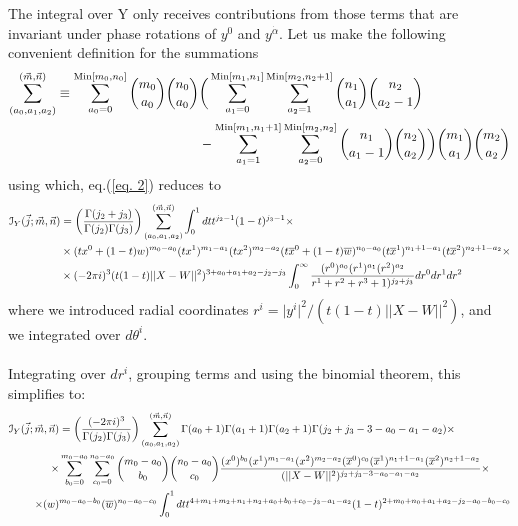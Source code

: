 \documentclass[../main.tex]{subfiles}
\begin{document}
The integral over Y only receives contributions from those terms that are invariant under phase rotations of $y^0$ and $y^{\dot{\alpha}}$. Let us make the following convenient definition for the summations
\begingroup \allowdisplaybreaks \begin{align}
    \sum_{(a_0,a_1,a_2)}^{(\vec{m},\vec{n})} \equiv \sum_{a_0=0}^{\text{Min}[m_0,n_0]} {m_0 \choose a_0}{n_0 \choose a_0} &\bigg( \sum_{a_1=0}^{\text{Min}[m_1,n_1]} \sum_{a_2=1}^{\text{Min}[m_2,n_2+1]} {n_1 \choose a_1}  {n_2 \choose a_2-1}  \\ &- \sum_{a_1=1}^{\text{Min}[m_1,n_1+1]} \sum_{a_2=0}^{\text{Min}[m_2,n_2]} {n_1 \choose a_1-1}  {n_2 \choose a_2}\bigg) {m_1 \choose a_1} {m_2 \choose a_2} \notag
\end{align} \endgroup
using which, eq.(\ref{eq. 2}) reduces to
\begingroup \allowdisplaybreaks \begin{align}
\mathcal{I}_Y (\vec{j};\vec{m}, \vec{n}) &= \bigg( \frac{\Gamma(j_2+j_3)}{\Gamma(j_2) \Gamma(j_3)} \bigg) \sum_{(a_0,a_1,a_2)}^{(\vec{m},\vec{n})} \int_0^1 dt t^{j_2-1} (1-t)^{j_3-1}  \times \\
    &\times (tx^0+(1-t)w)^{m_0-a_0} (tx^1)^{m_1-a_1}(tx^2)^{m_2-a_2}(t\overline{x}^0+(1-t)\overline{w})^{n_0-a_0} (t\overline{x}^1)^{n_1+1-a_1}(t\overline{x}^2)^{n_2+1-a_2} \times \notag\\
    & \times (-2 \pi i)^3 (t(1-t) \vert \vert X-W \vert \vert^2)^{3+a_0+a_1+a_2-j_2-j_3} \int_0^{\infty} \frac{(r^0)^{a_0} (r^1)^{a_1} (r^2)^{a_2} }{r^1+r^2+r^3+1)^{j_2+j_3}} dr^0 dr^1 dr^2 \notag
\end{align} \endgroup
where we introduced radial coordinates $r^i = \vert y^i \vert^2/(t(1-t)\vert \vert X-W \vert \vert^2)$, and we integrated over $d\theta^i$. \\ \\
Integrating over $dr^i$, grouping terms and using the binomial theorem, this simplifies to:
\begingroup \allowdisplaybreaks \begin{align}
\mathcal{I}_Y (\vec{j};\vec{m}, \vec{n}) &= \bigg( \frac{(-2\pi i)^3}{\Gamma(j_2) \Gamma(j_3)} \bigg) \sum_{(a_0,a_1,a_2)}^{(\vec{m},\vec{n})} \Gamma(a_0+1) \Gamma(a_1+1) \Gamma(a_2+1) \Gamma(j_2+j_3-3-a_0-a_1-a_2) \times \notag \\
\times& \sum_{b_0=0}^{m_0-a_0} \sum_{c_0=0}^{n_0-a_0} {m_0-a_0 \choose b_0} {n_0 -a_0 \choose c_0} \frac{(x^0)^{b_0} (x^1)^{m_1-a_1} (x^2)^{m_2-a_2} (\overline{x}^0)^{c_0} (\overline{x}^1)^{n_1+1-a_1} (\overline{x}^2)^{n_2+1-a_2}}{(\vert \vert X-W \vert \vert^2)^{j_2+j_3-3-a_0-a_1-a_2}} \times \notag \\
\times (w)&^{m_0-a_0-b_0} (\overline{w})^{n_0-a_0-c_0} \int_0^1 dt t^{4+m_1+m_2+n_1+n_2+a_0+b_0+c_0-j_3-a_1-a_2} (1-t)^{2+m_0+n_0+a_1+a_2-j_2-a_0-b_0-c_0} \notag
\end{align} \endgroup
\end{document}
